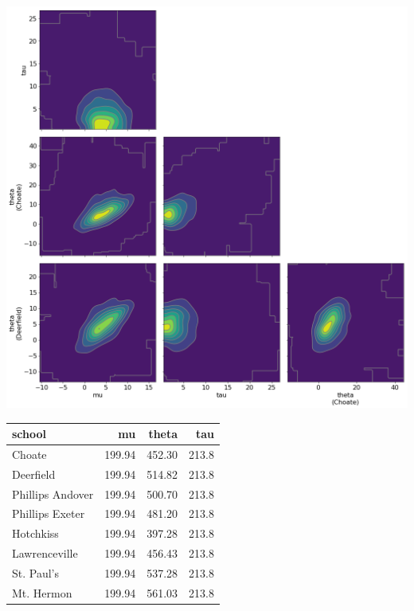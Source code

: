 \documentclass[a0,portrait]{a0poster}
\begin{document}
\begin{multicols}{3}
\begin{center}\vspace{1cm}
\includegraphics[width=1.0\linewidth]{figures/plot_pair_kde}
\end{center}

\begin{center}
\begin{tabular}{lrrr}
\toprule
school           &      mu &   theta &    tau \\
\midrule
Choate           &  199.94 &  452.30 &  213.8 \\
Deerfield        &  199.94 &  514.82 &  213.8 \\
Phillips Andover &  199.94 &  500.70 &  213.8 \\
Phillips Exeter  &  199.94 &  481.20 &  213.8 \\
Hotchkiss        &  199.94 &  397.28 &  213.8 \\
Lawrenceville    &  199.94 &  456.43 &  213.8 \\
St. Paul's       &  199.94 &  537.28 &  213.8 \\
Mt. Hermon       &  199.94 &  561.03 &  213.8 \\
\bottomrule
\end{tabular}
\end{center}


\end{multicols}
\end{document}
